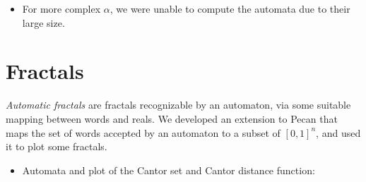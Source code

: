 \documentclass[landscape,usenames,dvipsnames]{sciposter}
\begin{document}
\begin{multicols}{3}
\begin{itemize}
    \item For more complex $\alpha$, we were unable to compute the automata due to their large size.
\end{itemize}

\columnbreak

\section*{Fractals}

\emph{Automatic fractals} are fractals recognizable by an automaton, via some suitable mapping between words and reals. 
We developed an extension to Pecan that maps the set of words accepted by an automaton to a subset of $[0, 1]^n$, and used it to plot some fractals.

\begin{itemize}
    \item Automata and plot of the Cantor set and Cantor distance function:
\end{itemize}


\end{multicols}
\end{document}
